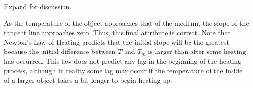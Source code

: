 \documentclass{ximera}
\begin{document}
\begin{problem}
\begin{center}  
\end{center}

Expand for discussion.

\begin{expandable}
    As the temperature of the object approaches that of the medium, the slope of the tangent line approaches zero.  Thus, this final attribute is correct.  Note that Newton’s Law of Heating predicts that the initial slope will be the greatest because the initial difference between $T$ and $T_m$ is larger than after some heating has occurred.  This law does not predict any lag in the beginning of the heating process, although in reality some lag may occur if the temperature of the inside of a larger object takes a bit longer to begin heating up. 
 \end{expandable}

\begin{center}  
\end{center}


\end{problem}
\end{document}

